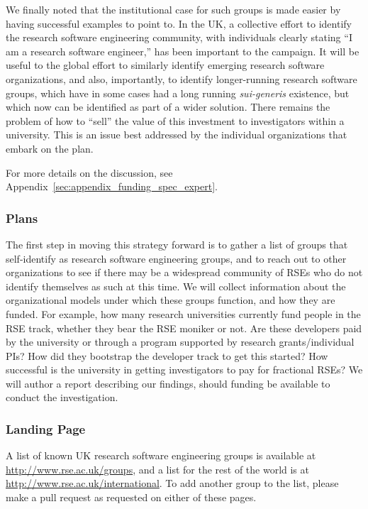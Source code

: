 We finally noted that the institutional case for such groups is made easier by
having successful examples to point to. In the UK, a collective effort to
identify the research software engineering community, with individuals clearly
stating ``I am a research software engineer,'' has been important to the
campaign. It will be useful to the global effort to similarly identify emerging
research software organizations, and also, importantly, to identify
longer-running research software groups, which have in some cases had a long
running \emph{sui-generis} existence, but which now can be identified as part of
a wider solution. There remains the problem of how to ``sell'' the value of this
investment to investigators within a university. This is an issue best addressed
by the individual organizations that embark on the plan.

For more details on the discussion, see
Appendix~\ref{sec:appendix_funding_spec_expert}.

\subsubsection{Plans}

The first step in moving this strategy forward is to gather a list of groups
that self-identify as research software engineering groups, and to reach out to
other organizations to see if there may be a widespread community of RSEs who do
not identify themselves as such at this time. We will collect information about
the organizational models under which these groups function, and how they are
funded. For example, how many research universities currently fund people in the
RSE track, whether they bear the RSE moniker or not. Are these developers paid
by the university or through a program supported by research grants/individual
PIs? How did they bootstrap the developer track to get this started? How
successful is the university in getting investigators to pay for fractional
RSEs? We will author a report describing our findings, should funding be
available to conduct the investigation.

\subsubsection{Landing Page}

A list of known UK research software engineering groups is available at  
\url{http://www.rse.ac.uk/groups}, and a list for the rest of the world
is at \url{http://www.rse.ac.uk/international}.
To add another group to the list, please make a pull request as requested
on either of these pages.
